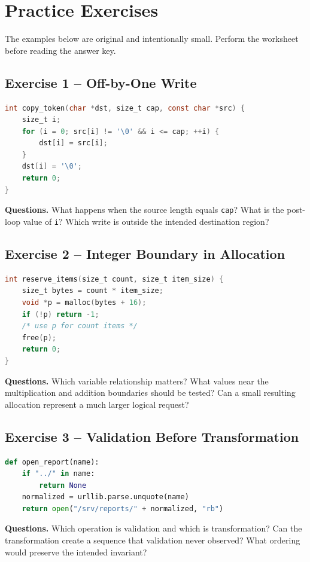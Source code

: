 \documentclass[10pt]{article}
\newcommand{\workarea}[1]{\par\smallskip\noindent\begin{tcolorbox}[height=#1,colback=white,colframe=linegray,boxrule=0.5pt,arc=0pt,left=2pt,right=2pt,top=2pt,bottom=2pt]\mbox{}\end{tcolorbox}\par}
\begin{document}
\section{Practice Exercises}
The examples below are original and intentionally small. Perform the worksheet before reading the answer key.

\subsection{Exercise 1 -- Off-by-One Write}
\begin{lstlisting}[language=C]
int copy_token(char *dst, size_t cap, const char *src) {
    size_t i;
    for (i = 0; src[i] != '\0' && i <= cap; ++i) {
        dst[i] = src[i];
    }
    dst[i] = '\0';
    return 0;
}
\end{lstlisting}
\textbf{Questions.} What happens when the source length equals \texttt{cap}? What is the post-loop value of \texttt{i}? Which write is outside the intended destination region?
\workarea{0.9in}

\subsection{Exercise 2 -- Integer Boundary in Allocation}
\begin{lstlisting}[language=C]
int reserve_items(size_t count, size_t item_size) {
    size_t bytes = count * item_size;
    void *p = malloc(bytes + 16);
    if (!p) return -1;
    /* use p for count items */
    free(p);
    return 0;
}
\end{lstlisting}
\textbf{Questions.} Which variable relationship matters? What values near the multiplication and addition boundaries should be tested? Can a small resulting allocation represent a much larger logical request?
\workarea{0.9in}

\subsection{Exercise 3 -- Validation Before Transformation}
\begin{lstlisting}[language=Python]
def open_report(name):
    if "../" in name:
        return None
    normalized = urllib.parse.unquote(name)
    return open("/srv/reports/" + normalized, "rb")
\end{lstlisting}
\textbf{Questions.} Which operation is validation and which is transformation? Can the transformation create a sequence that validation never observed? What ordering would preserve the intended invariant?
\workarea{0.9in}
\end{document}

